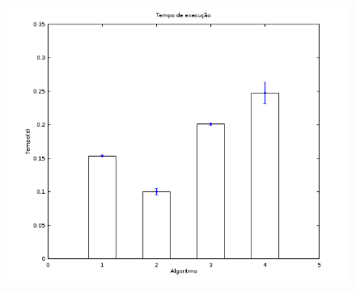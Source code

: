 \documentclass{beamer}
\begin{document}
\begin{frame}
	\begin{figure}[!h]
		\centering
		\includegraphics[scale=0.4]{d.png}
	\end{figure}
\end{frame}
\end{document}
